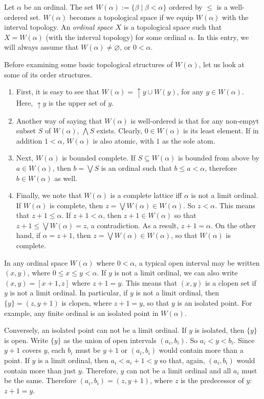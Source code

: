 \documentclass[12pt]{article}
\newcommand{\up}{\uparrow\!\!}
\begin{document}
Let $\alpha$ be an ordinal.  The set $W(\alpha):=\lbrace \beta \mid \beta < \alpha\rbrace$ ordered by $\le$ is a well-ordered set.  $W(\alpha)$ becomes a topological space if we equip $W(\alpha)$ with the interval topology.  An \emph{ordinal space} $X$ is a topological space such that $X=W(\alpha)$ (with the interval topology) for some ordinal $\alpha$.  In this entry, we will always assume that $W(\alpha)\ne \varnothing$, or $0<\alpha$.

Before examining some basic topological structures of $W(\alpha)$, let us look at some of its order structures.  
\begin{enumerate}
\item
First, it is easy to see that $W(\alpha)=\up y \cup W(y)$, for any $y\in W(\alpha)$.  Here, $\up y$ is the upper set of $y$.
\item
Another way of saying that $W(\alpha)$ is well-ordered is that for any non-empyt subset $S$ of $W(\alpha)$, $\bigwedge S$ exists.  Clearly, $0\in W(\alpha)$ is its least element.  If in addition $1<\alpha$, $W(\alpha)$ is also atomic, with $1$ as the sole atom.
\item
Next, $W(\alpha)$ is bounded complete.  If $S\subseteq W(\alpha)$ is bounded from above by $a\in W(\alpha)$, then $b=\bigvee S$ is an ordinal such that $b\le a<\alpha$, therefore $b\in W(\alpha)$ as well.  
\item
Finally, we note that $W(\alpha)$ is a complete lattice iff $\alpha$ is not a limit ordinal.  If $W(\alpha)$ is complete, then $z=\bigvee W(\alpha)\in W(\alpha)$.  So $z<\alpha$.  This means that $z+1\le \alpha$.  If $z+1<\alpha$, then $z+1\in W(\alpha)$ so that $z+1\le \bigvee W(\alpha)=z$, a contradiction.  As a result, $z+1=\alpha$.  On the other hand, if $\alpha=z+1$, then $z=\bigvee W(\alpha)\in W(\alpha)$, so that $W(\alpha)$ is complete.
\end{enumerate}

In any ordinal space $W(\alpha)$ where $0<\alpha$, a typical open interval may be written $(x,y)$, where $0\le x\le y<\alpha$.  If $y$ is not a limit ordinal, we can also write $(x,y)=[x+1,z]$ where $z+1=y$.  This means that $(x,y)$ is a clopen set if $y$ is not a limit ordinal.  In particular, if $y$ is not a limit ordinal, then $\lbrace y\rbrace = (z,y+1)$ is clopen, where $z+1=y$, so that $y$ is an isolated point.  For example, any finite ordinal is an isolated point in $W(\alpha)$.  

Conversely, an isolated point can not be a limit ordinal.  If $y$ is isolated, then $\lbrace y\rbrace$ is open.  Write $\lbrace y\rbrace$ as the union of open intervals $(a_i,b_i)$.  So $a_i<y<b_i$.  Since $y+1$ covers $y$, each $b_i$ must be $y+1$ or $(a_i,b_i)$ would contain more than a point.  If $y$ is a limit ordinal, then $a_i<a_i+1<y$ so that, again, $(a_i,b_i)$ would contain more than just $y$.  Therefore, $y$ can not be a limit ordinal and all $a_i$ must be the same.  Therefore $(a_i,b_i)=(z,y+1)$, where $z$ is the predecessor of $y$: $z+1=y$.
\end{document}
